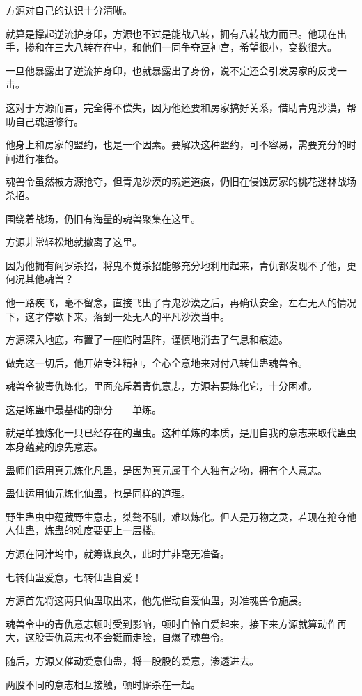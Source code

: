 \begin{this_body}
方源对自己的认识十分清晰。

就算是撑起逆流护身印，方源也不过是能战八转，拥有八转战力而已。他现在出手，掺和在三大八转存在中，和他们一同争夺豆神宫，希望很小，变数很大。

一旦他暴露出了逆流护身印，也就暴露出了身份，说不定还会引发房家的反戈一击。

这对于方源而言，完全得不偿失，因为他还要和房家搞好关系，借助青鬼沙漠，帮助自己魂道修行。

他身上和房家的盟约，也是一个因素。要解决这种盟约，可不容易，需要充分的时间进行准备。

魂兽令虽然被方源抢夺，但青鬼沙漠的魂道道痕，仍旧在侵蚀房家的桃花迷林战场杀招。

围绕着战场，仍旧有海量的魂兽聚集在这里。

方源非常轻松地就撤离了这里。

因为他拥有阎罗杀招，将鬼不觉杀招能够充分地利用起来，青仇都发现不了他，更何况其他魂兽？

他一路疾飞，毫不留念，直接飞出了青鬼沙漠之后，再确认安全，左右无人的情况下，这才停歇下来，落到一处无人的平凡沙漠当中。

方源深入地底，布置了一座临时蛊阵，谨慎地消去了气息和痕迹。

做完这一切后，他开始专注精神，全心全意地来对付八转仙蛊魂兽令。

魂兽令被青仇炼化，里面充斥着青仇意志，方源若要炼化它，十分困难。

这是炼蛊中最基础的部分——单炼。

就是单独炼化一只已经存在的蛊虫。这种单炼的本质，是用自我的意志来取代蛊虫本身蕴藏的原先意志。

蛊师们运用真元炼化凡蛊，是因为真元属于个人独有之物，拥有个人意志。

蛊仙运用仙元炼化仙蛊，也是同样的道理。

野生蛊虫中蕴藏野生意志，桀骜不驯，难以炼化。但人是万物之灵，若现在抢夺他人仙蛊，炼蛊的难度要更上一层楼。

方源在问津坞中，就筹谋良久，此时并非毫无准备。

七转仙蛊爱意，七转仙蛊自爱！

方源首先将这两只仙蛊取出来，他先催动自爱仙蛊，对准魂兽令施展。

魂兽令中的青仇意志顿时受到影响，顿时自怜自爱起来，接下来方源就算动作再大，这股青仇意志也不会铤而走险，自爆了魂兽令。

随后，方源又催动爱意仙蛊，将一股股的爱意，渗透进去。

两股不同的意志相互接触，顿时厮杀在一起。


\end{this_body}

